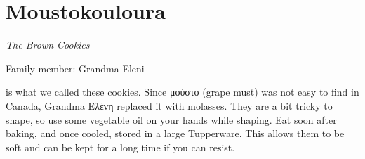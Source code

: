 \chapter{Moustokouloura}
\label{ch:moustokouloura}



\textit{The Brown Cookies}

Family member: Grandma Eleni

 is what we called these cookies. Since \textgreek{μούστο} (grape must) was not easy to find in Canada, Grandma \textgreek{Ελένη} replaced it with molasses. They are a bit tricky to shape, so use some vegetable oil on your hands while shaping. Eat soon after baking, and once cooled, stored in a large Tupperware. This allows them to be soft and can be kept for a long time if you can resist.

